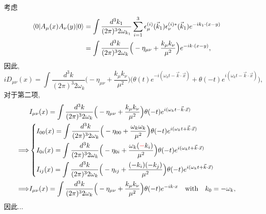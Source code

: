 \begin{itemize}
	\begin{tcolorbox}[title=calculation:]
		考虑
		\begin{align}
			\braket{0 | A_\mu(x) A_\nu(y) | 0} &= \int \frac{d^3 k_1}{(2 \pi)^3 2 \omega_{k_1}} \sum_{i = 1}^3 \epsilon^{(i)}_\mu(\vec{k}_1) \epsilon^{(i) *}_\nu(\vec{k}_1) e^{- i k_1 \cdot (x - y)} \notag \\
			&= \int \frac{d^3 k}{(2 \pi)^3 2 \omega_k} \Big( - \eta_{\mu \nu} + \frac{k_\mu k_\nu}{\mu^2} \Big) e^{- i k \cdot (x - y)},
		\end{align}
		因此,
		\begin{equation}
			i D_{\mu \nu}(x) = \int \frac{d^3 k}{(2 \pi)^3 2 \omega_k} \Big( - \eta_{\mu \nu} + \frac{k_\mu k_\nu}{\mu^2} \Big) \Big( \theta(t) e^{- i (\omega_k t - \vec{k} \cdot \vec{x})} + \theta(- t) e^{i (\omega_k t - \vec{k} \cdot \vec{x})} \Big),
		\end{equation}
		对于第二项,
		\begin{align}
			& I_{\mu \nu}(x) = \int \frac{d^3 k}{(2 \pi)^3 2 \omega_k} \Big( - \eta_{\mu \nu} + \frac{k_\mu k_\nu}{\mu^2} \Big) \theta(- t) e^{i (\omega_k t - \vec{k} \cdot \vec{x})} \notag \\
			\Longrightarrow & \begin{dcases}
				I_{0 0}(x) = \int \frac{d^3 k}{(2 \pi)^3 2 \omega_k} \Big( - \eta_{0 0} + \frac{\omega_k \omega_k}{\mu^2} \Big) \theta(- t) e^{i (\omega_k t + \vec{k} \cdot \vec{x})} \\
				I_{0 i}(x) = \int \frac{d^3 k}{(2 \pi)^3 2 \omega_k} \Big( - \eta_{0 i} + \frac{\omega_k (\mathcolor{red}{-} k_i)}{\mu^2} \Big) \theta(- t) e^{i (\omega_k t + \vec{k} \cdot \vec{x})} \\
				I_{i j}(x) = \int \frac{d^3 k}{(2 \pi)^3 2 \omega_k} \Big( - \eta_{i j} + \frac{(- k_i) (- k_j)}{\mu^2} \Big) \theta(- t) e^{i (\omega_k t + \vec{k} \cdot \vec{x})}
			\end{dcases} \notag \\
			\Longrightarrow & I_{\mu \nu}(x) = \int \frac{d^3 k}{(2 \pi)^3 2 \omega_k} \Big( - \eta_{\mu \nu} + \frac{k_\mu k_\nu}{\mu^2} \Big) \theta(- t) e^{- i k \cdot x} \quad \text{with} \quad k_0 = - \omega_k,
		\end{align}
		因此...
	\end{tcolorbox}
\end{itemize}


